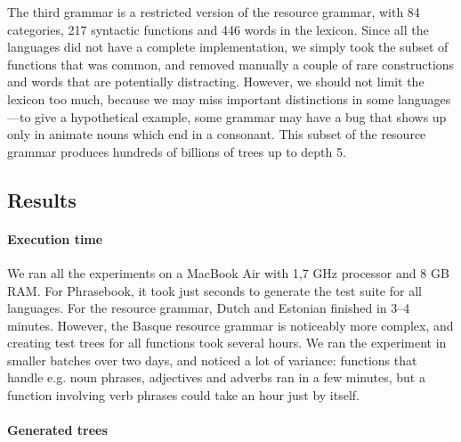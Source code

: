 

The third grammar is a restricted version of the \gf{} resource grammar,
with 84 categories, 217 syntactic functions and 446 words in the
lexicon. Since all the languages did not have a complete
implementation, we simply took the subset of functions that was
common, and removed manually a couple of rare constructions and words
that are potentially distracting. However, we should not limit the
lexicon too much, because we may miss important distinctions 
in some languages---to give a hypothetical example, some grammar may
have a bug that shows up only in animate nouns which end in a
consonant. This subset of the resource grammar produces hundreds of
billions of trees up to depth 5. 

\subsection{Results}

\paragraph{Execution time} We ran all the experiments on a MacBook Air
with 1,7 GHz processor and 8 GB RAM. For Phrasebook, it took just
seconds to generate the test suite for all languages. For the resource
grammar, Dutch and Estonian finished in 3--4 minutes. However, the
Basque resource grammar is noticeably more complex, and creating test
trees for all functions took several hours. We ran the experiment in
smaller batches over two days, and noticed a lot of variance:
functions that handle e.g. noun phrases, adjectives and adverbs ran in
a few minutes, but a function involving verb phrases could take an
hour just by itself.

\paragraph{Generated trees}

